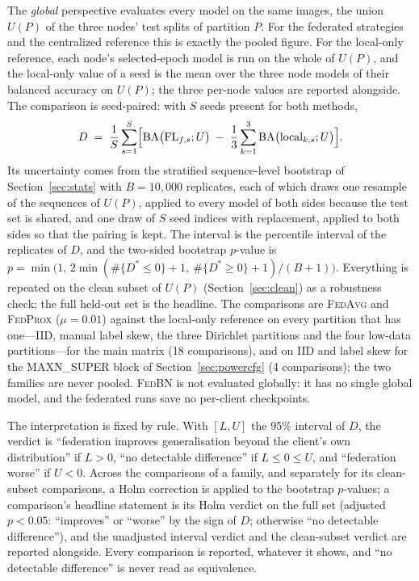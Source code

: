 \documentclass[journal]{IEEEtran}
\newcommand{\fedavg}{\textsc{FedAvg}}
\newcommand{\fedprox}{\textsc{FedProx}}
\newcommand{\fedbn}{\textsc{FedBN}}
\begin{document}
The \emph{global} perspective evaluates every model on the same images, the union $U(P)$ of the three nodes' test splits of partition $P$. For the federated strategies and the centralized reference this is exactly the pooled figure. For the local-only reference, each node's selected-epoch model is run on the whole of $U(P)$, and the local-only value of a seed is the mean over the three node models of their balanced accuracy on $U(P)$; the three per-node values are reported alongside. The comparison is seed-paired: with $S$ seeds present for both methods,
\begin{equation}
D \;=\; \frac{1}{S}\sum_{s=1}^{S}\Bigl[\mathrm{BA}\bigl(\mathrm{FL}_{f,s};U\bigr) \;-\; \frac{1}{3}\sum_{k=1}^{3}\mathrm{BA}\bigl(\mathrm{local}_{k,s};U\bigr)\Bigr].
\label{eq:globaldiff}
\end{equation}
Its uncertainty comes from the stratified sequence-level bootstrap of Section~\ref{sec:stats} with $B = 10{,}000$ replicates, each of which draws one resample of the sequences of $U(P)$, applied to every model of both sides because the test set is shared, and one draw of $S$ seed indices with replacement, applied to both sides so that the pairing is kept. The interval is the percentile interval of the replicates of $D$, and the two-sided bootstrap $p$-value is $p=\min\bigl(1,\,2\min(\#\{D^{*}\le 0\}+1,\ \#\{D^{*}\ge 0\}+1)/(B+1)\bigr)$. Everything is repeated on the clean subset of $U(P)$ (Section~\ref{sec:clean}) as a robustness check; the full held-out set is the headline. The comparisons are \fedavg{} and \fedprox{} ($\mu=0.01$) against the local-only reference on every partition that has one---IID, manual label skew, the three Dirichlet partitions and the four low-data partitions---for the main matrix (18 comparisons), and on IID and label skew for the MAXN\_SUPER block of Section~\ref{sec:powercfg} (4 comparisons); the two families are never pooled. \fedbn{} is not evaluated globally: it has no single global model, and the federated runs save no per-client checkpoints.

The interpretation is fixed by rule. With $[L, U]$ the 95\% interval of $D$, the verdict is ``federation improves generalisation beyond the client's own distribution'' if $L>0$, ``no detectable difference'' if $L\le 0\le U$, and ``federation worse'' if $U<0$. Across the comparisons of a family, and separately for its clean-subset comparisons, a Holm correction is applied to the bootstrap $p$-values; a comparison's headline statement is its Holm verdict on the full set (adjusted $p<0.05$: ``improves'' or ``worse'' by the sign of $D$; otherwise ``no detectable difference''), and the unadjusted interval verdict and the clean-subset verdict are reported alongside. Every comparison is reported, whatever it shows, and ``no detectable difference'' is never read as equivalence.
\end{document}
